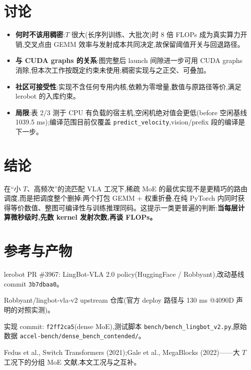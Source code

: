 \documentclass[11pt]{ctexart}
\begin{document}
\section{讨论}
\begin{itemize}
\item \textbf{何时不该用稠密}:$T$ 很大(长序列训练、大批次)时 8 倍 FLOPs 成为真实算力开销,交叉点由 GEMM 效率与发射成本共同决定,故保留阈值开关与回退路径。
\item \textbf{与 CUDA graphs 的关系}:图完整后 launch 间隙进一步可用 CUDA graphs 消除,但本次工作按既定约束未使用;稠密实现与之正交、可叠加。
\item \textbf{社区可接受性}:实现不含任何专用内核,依赖为零增量,数值与原路径等价,满足 lerobot 的入库约束。
\item \textbf{局限}:表 2/3 测于 CPU 有负载的宿主机,空闲机绝对值会更低(before 空闲基线 1039.5 ms);编译范围目前仅覆盖 \texttt{predict\_velocity},vision/prefix 段的编译是下一步。
\end{itemize}

\section{结论}
在``小 $T$、高频次''的流匹配 VLA 工况下,稀疏 MoE 的最优实现不是更精巧的路由调度,而是把调度整个删掉:两个打包 GEMM + 权重折叠,在纯 PyTorch 内同时获得等价数值、整图可编译性与训练推理同码。这提示一类更普遍的判断:\textbf{当每层计算微秒级时,先数 kernel 发射次数,再谈 FLOPs。}

\section*{参考与产物}
\begin{enumerate}[label={[\arabic*]},leftmargin=2.2em]
\item lerobot PR \#3967: LingBot-VLA 2.0 policy(HuggingFace / Robbyant),改动基线 commit \texttt{3b7dbaa0}。
\item Robbyant/lingbot-vla-v2 upstream 仓库(官方 deploy 路径与 130 ms @4090D 声明的对照实测)。
\item 实现 commit: \texttt{f2ff2ca5}(dense MoE),测试脚本 \texttt{bench/bench\_lingbot\_v2.py},原始数据 \texttt{accel-bench/dense\_bench\_contended/}。
\item Fedus et al., Switch Transformers (2021);Gale et al., MegaBlocks (2022)——大 $T$ 工况下的分组 MoE 文献,本文工况与之互补。
\end{enumerate}
\end{document}
